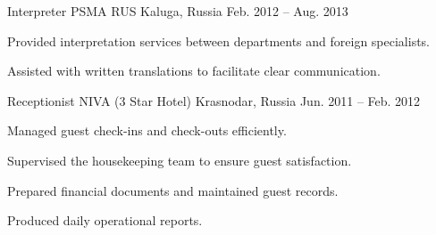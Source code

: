 \begin{cventries}
  \cventry
    {Interpreter} %
    {PSMA RUS} %
    {Kaluga, Russia} %
    {Feb. 2012 -- Aug. 2013} %
    {
      \begin{cvitems} %
        \item {Provided interpretation services between departments and foreign specialists.}
        \item {Assisted with written translations to facilitate clear communication.}
      \end{cvitems}
    }

  \cventry
    {Receptionist} %
    {NIVA (3 Star Hotel)} %
    {Krasnodar, Russia} %
    {Jun. 2011 -- Feb. 2012} %
    {
      \begin{cvitems} %
        \item {Managed guest check-ins and check-outs efficiently.}
        \item {Supervised the housekeeping team to ensure guest satisfaction.}
        \item {Prepared financial documents and maintained guest records.}
        \item {Produced daily operational reports.}
      \end{cvitems}
    }

\end{cventries}
